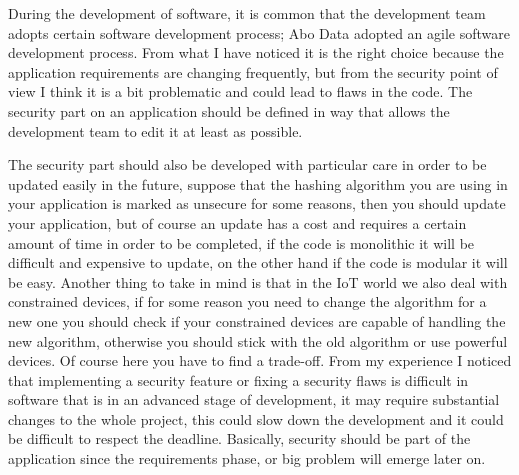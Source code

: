 During the development of software, it is common that the development team adopts certain software development process; Abo Data adopted an agile software development process.\newline
From what I have noticed it is the right choice because the application requirements are changing frequently, but from the security point of view I think it is a bit problematic and could lead to flaws in the code.\newline
The security part on an application should be defined in way that allows the development team to edit it at least as possible.\newline

The security part should also be developed with particular care in order to be updated easily in the future, suppose that the hashing algorithm you are using in your application is marked as unsecure for some reasons, then you should update your application, but of course an update has a cost and requires a certain amount of time in order to be completed, if the code is monolithic it will be difficult and expensive to update, on the other hand if the code is modular it will be easy.\newline
Another thing to take in mind is that in the IoT world we also deal with constrained devices, if for some reason you need to change the algorithm for a new one you should check if your constrained devices are capable of handling the new algorithm, otherwise you should stick with the old algorithm or use powerful devices. Of course here you have to find a trade-off.\newline
From my experience I noticed that implementing a security feature or fixing a security flaws is difficult in software that is in an advanced stage of development, it may require substantial changes to the whole project, this could slow down the development and it could be difficult to respect the deadline.\newline
Basically, security should be part of the application since the requirements phase, or big problem will emerge later on.\newline

